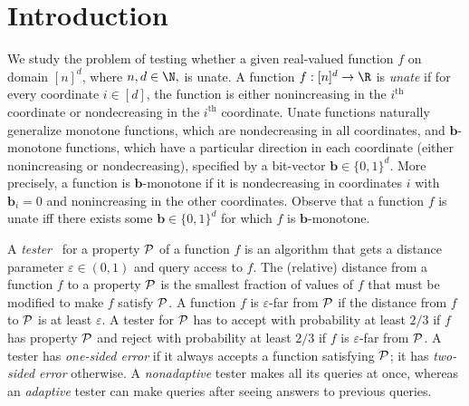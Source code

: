 \documentclass{toc}
\newcommand{\eps}{\varepsilon}
\newcommand{\ord}[2][th]{\ensuremath{{#2}^{\mathrm{#1}}}}
\newcommand{\bb}{\ensuremath{\mathbf{b}}}
\begin{document}
%
%
%

\section{Introduction}
%
We study the problem of testing whether a given real-valued function $f$ on domain $[n]^d$, where $n,d\in\N,$ is unate.
A function
$f:[n]^d \to \R$
is \emph{unate} if for every coordinate $i\in [d]$, the function is either nonincreasing in the $\ord{i}$ coordinate or nondecreasing in the $\ord{i}$ coordinate.
Unate functions naturally generalize monotone functions, which are nondecreasing in all coordinates, and $\bb$-monotone functions, which have a particular direction in each coordinate (either nonincreasing or nondecreasing), specified by a bit-vector $\bb\in \{0,1\}^d$. More precisely,
%
 a function is $\bb$-monotone if it is nondecreasing in coordinates $i$ with $\bb_i = 0$ and nonincreasing in the other coordinates. Observe that a function $f$ is unate iff there exists some $\bb\in \{0,1\}^d$ for which $f$ is $\bb$-monotone.

A \emph{tester}~\cite{RS96,GGR98} for a property $\cal P$ of a function $f$ is an algorithm that gets a distance parameter $\eps\in(0,1)$ and query access to $f$. The (relative) distance from a function $f$ to a property $\cal P$ is the smallest fraction of values of $f$ that must be modified to make $f$ satisfy $\cal P$. A function $f$ is $\eps$-far from $\cal P$ if the distance from $f$ to $\cal P$ is at least $\eps$. A tester for $\cal P$ has to accept with probability at least $2/3$ if $f$ has property $\cal P$ and reject with probability at least $2/3$ if $f$ is $\eps$-far from $\cal P$. A tester has \emph{one-sided error} if it always accepts a function satisfying $\cal P$; it has \emph{ two-sided
error} otherwise.
A \emph{nonadaptive} tester makes all its queries at once, whereas an \emph{adaptive} tester can make queries after seeing answers to previous queries.
\end{document}
